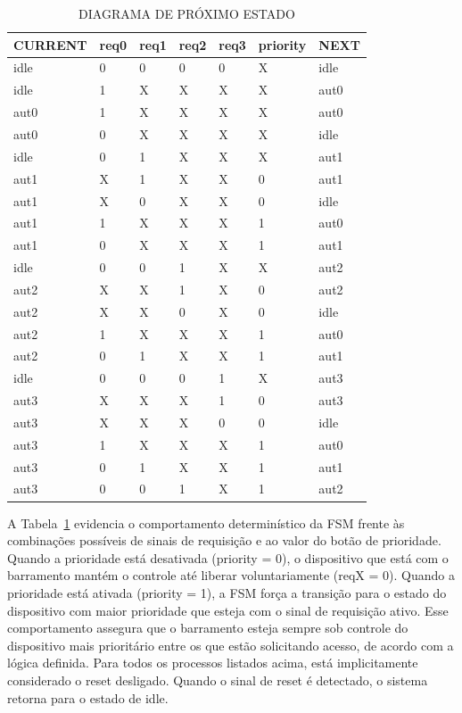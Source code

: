 \documentclass[oneside]{uffstex}
\begin{document}
\begin{table}[H]
    \centering
    \caption{DIAGRAMA DE PRÓXIMO ESTADO}
    \begin{tabular}{|p{2cm}|p{1cm}|p{1cm}|p{1cm}|p{1cm}|p{2cm}|p{2cm}|}
        \hline
        CURRENT & req0 & req1 & req2 & req3 & priority & NEXT \\ 
        \hline
        idle & 0 & 0 & 0 & 0 & X & idle \\
        \hline
        idle & 1 & X & X & X & X & aut0 \\
        \hline
        aut0 & 1 & X & X & X & X & aut0 \\
        \hline
        aut0 & 0 & X & X & X & X & idle \\
        \hline
        idle & 0 & 1 & X & X & X & aut1 \\
        \hline
        aut1 & X & 1 & X & X & 0 & aut1 \\
        \hline
        aut1 & X & 0 & X & X & 0 & idle \\
        \hline
        aut1 & 1 & X & X & X & 1 & aut0 \\ 
        \hline
        aut1 & 0 & X & X & X & 1 & aut1 \\ 
        \hline
        idle & 0 & 0 & 1 & X & X & aut2 \\
        \hline
        aut2 & X & X & 1 & X & 0 & aut2 \\
        \hline
        aut2 & X & X & 0 & X & 0 & idle \\
        \hline
        aut2 & 1 & X & X & X & 1 & aut0 \\
        \hline
        aut2 & 0 & 1 & X & X & 1 & aut1 \\
        \hline
        idle & 0 & 0 & 0 & 1 & X & aut3 \\
        \hline
        aut3 & X & X & X & 1 & 0 & aut3\\
        \hline
        aut3 & X & X & X & 0 & 0 & idle\\
        \hline
        aut3 & 1 & X & X & X & 1 & aut0\\
        \hline
        aut3 & 0 & 1 & X & X & 1 & aut1\\
        \hline
        aut3 & 0 & 0 & 1 & X & 1 & aut2\\
        \hline
    \end{tabular}
    \label{tab:diagramaestados}
\end{table}

A Tabela~\ref{tab:diagramaestados} evidencia o comportamento determinístico da FSM frente às combinações possíveis de sinais de requisição e ao valor do botão de prioridade. Quando a prioridade está desativada (priority = 0), o dispositivo que está com o barramento mantém o controle até liberar voluntariamente (reqX = 0). Quando a prioridade está ativada (priority = 1), a FSM força a transição para o estado do dispositivo com maior prioridade que esteja com o sinal de requisição ativo. Esse comportamento assegura que o barramento esteja sempre sob controle do dispositivo mais prioritário entre os que estão solicitando acesso, de acordo com a lógica definida.
Para todos os processos listados acima, está implicitamente considerado o reset desligado. Quando o sinal de reset é detectado, o sistema retorna para o estado de idle.  
\end{document}
